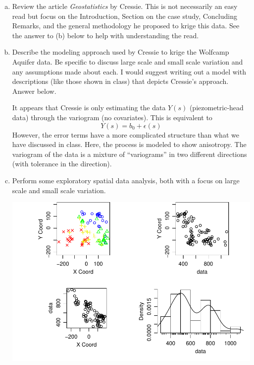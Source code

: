 \documentclass[letterpaper, 12pt]{article}\usepackage[]{graphicx}\usepackage[]{color}
\makeatletter
\def\maxwidth{ %
  \ifdim\Gin@nat@width>\linewidth
    \linewidth
  \else
    \Gin@nat@width
  \fi
}
\newenvironment{knitrout}{}{} %
\makeatother
\begin{document}
\begin{enumerate}[a.]
\item
Review the article \textit{Geostatistics} by Cressie. This is not necessarily an easy read but focus on the Introduction, Section on the case study, Concluding Remarks, and the general methodology he proposed to krige this data. See the answer to (b) below to help with understanding the read.

\item
Describe the modeling approach used by Cressie to krige the Wolfcamp Aquifer data. Be specific to discuss large scale and small scale variation and any assumptions made about each. I would suggest writing out a model with descriptions (like those shown in class) that depicts Cressie’s approach. Answer below.

{\sf
It appears that Cressie is only estimating the data $Y(s)$ (piezometric-head data) through the variogram (no covariates). This is equivalent to 
\[
Y(s) = b_0 + \epsilon(s)
\]
However, the error terms have a more complicated structure than what we have discussed in class. Here, the process is modeled to show anisotropy. The variogram of the data is a mixture of ``variograms'' in two different directions (with tolerance in the direction).
}

\item
Perform some exploratory spatial data analysis, both with a focus on large scale and small scale variation.

\begin{knitrout}
\color{fgcolor}
\includegraphics[width=\maxwidth]{figure/wolfcamp2} 

\end{knitrout}


\end{enumerate}
\end{document}
